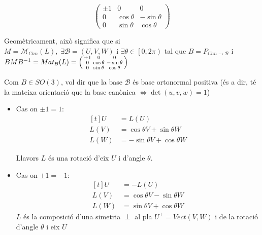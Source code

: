 \documentclass[a4paper,12pt]{article}
\begin{document}
\begin{itemize}
\begin{proposicio}
\begin{displaymath}
\begin{pmatrix}
	                \pm 1 & 0 & 0\\
	                0 & \cos{\theta} & -\sin{\theta}\\
	                0 & \sin{\theta} & \cos{\theta}
	            \end{pmatrix}
	        \end{displaymath}
	    \end{proposicio}
	    Geomètricament, això significa que si $M = \mathcal{M}_{\textit{Can}} (L),\; \exists \mathcal{B} = \left(U, V, W\right)\text{ i }\exists \theta \in \left[0, 2\pi\right)$
	    tal que $B = P_{\textit{Can}\to\mathcal{B}}$ i $BMB^{-1} = Mat_\mathcal{B}(L) =
		\begin{psmallmatrix}
	        \pm 1 & 0 & 0\\
	        0 & \cos{\theta} & -\sin{\theta}\\
	        0 & \sin{\theta} & \cos{\theta}
	    \end{psmallmatrix}$

	    Com $B \in SO(3)$, vol dir que la base $\mathcal{B}$ és base ortonormal positiva (és a dir, té
	    la mateixa orientació que la base canònica $\Leftrightarrow \det{\left(u,v,w\right)} = 1$)
	    \begin{itemize}
	        \item Cas on $\pm 1 = 1$:
			\begin{displaymath}
				\begin{aligned}[t]
					U &= L(U)\\
				    L(V) &= \cos{\theta}V + \sin{\theta}W\\
				    L(W) &= -\sin{\theta}V + \cos{\theta}W
				\end{aligned}
			\end{displaymath}

	        Llavors $L$ és una rotació d'eix $U$ i d'angle $\theta$.

			\item Cas on $\pm 1 = -1$:
	        \begin{displaymath}
				\begin{aligned}[t]
					U &= -L(U)\\
				    L(V) &= \cos{\theta}V - \sin{\theta}W\\
				    L(W) &= \sin{\theta}V + \cos{\theta}W
				\end{aligned}
			\end{displaymath}
	        $L$ és la composició d'una simetria $\perp$ al pla $U^\perp = Vect(V, W)$ i de la rotació
	        d'angle $\theta$ i eix $U$
	    \end{itemize}


\end{itemize}
\end{document}
